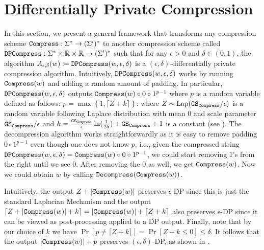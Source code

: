 \section{Differentially Private Compression}

In this section, we present a general framework that transforms any compression scheme $\mathtt{Compress}:\Sigma^*\rightarrow(\Sigma')^*$ to another compression scheme called $\mathtt{DPCompress}:\Sigma^*\times\mathbb{R}\times\mathbb{R}\rightarrow(\Sigma')^*$ such that for any $\epsilon>0$ and $\delta \in(0,1)$, the algorithm  $A_{\epsilon,\delta}(w) \coloneqq \mathtt{DPCompress}(w,\epsilon,\delta)$ is a $(\epsilon,\delta)$-differentially private compression algorithm. Intuitively, $\mathtt{DPCompress}(w,\epsilon,\delta)$ works by running $\mathtt{Compress}(w)$ and adding a random amount of padding. In particular, $\mathtt{DPCompress}(w,\epsilon,\delta)$ outputs $\mathtt{Compress}(w) \circ 0\circ 1^{p-1}$ where $p$ is a random variable defined as follows: $p=\max\left\{1, \lceil Z+k\rceil \right\}$: where $Z\sim\mathrm{Lap}(\mathtt{GS}_{\mathtt{Compress}}/\epsilon)$ is a random variable following Laplace distribution with mean $0$ and scale parameter $\mathtt{GS}_{\mathtt{Compress}}/\epsilon$ and $k=\frac{\mathtt{GS}_{\mathtt{Compress}}}{\epsilon}\ln(\frac{1}{2\delta})+\mathtt{GS}_{\mathtt{Compress}} +1$ is a constant (see ). The decompression algorithm works straightforwardly as it is easy to remove padding $0\circ 1^{p-1}$ even though one does not know $p$, i.e., given the compressed string $\mathtt{DPCompress}(w,\epsilon,\delta)=\mathtt{Compress}(w)\circ0\circ1^{p-1}$, we could start removing $1$'s from the right until we see $0$. After removing the $0$ as well, we get $\mathtt{Compress}(w)$. Now we could obtain $w$ by calling $\mathtt{Decompress}(\mathtt{Compress}(w))$.


Intuitively, the output $Z+\left|\mathtt{Compress}(w) \right|$ preserves $\epsilon$-DP since this is just the standard Laplacian Mechanism and the output $\lceil Z+\left|\mathtt{Compress}(w) \right| + k\rceil =  \left|\mathtt{Compress}(w) \right| + \lceil Z+k\rceil$ also preserves $\epsilon$-DP since it can be viewed as post-processing applied to a DP output. Finally, note that by our choice of $k$ we have $\Pr[p \neq \lceil Z+k\rceil ] =  \Pr[Z+k \leq 0] \leq \delta$. It follows that the output $\left|\mathtt{Compress}(w) \right| + p$ preserves $(\epsilon,\delta)$-DP, as shown in .

